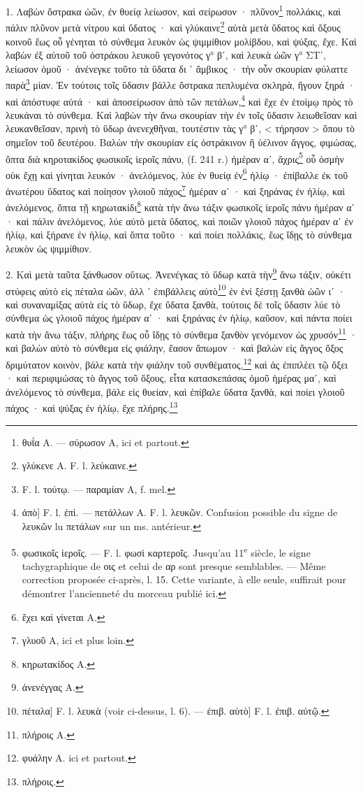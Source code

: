 \documentclass[a4paper, 11pt, oneside, polutonikogreek, french]{article}
\begin{document}
1. Λαβὼν ὄστρακα ὠῶν, ἐν θυείᾳ λείωσον, καὶ σείρωσον · πλῦνον\footnote{θυΐα A. --- σύρωσον A, ici et partout.} πολλάκις, καὶ πάλιν πλῦνον μετὰ νίτρου καὶ ὕδατος · καὶ γλύκαινε\footnote{γλύκενε A. F. l. λεύκαινε.} αὐτὰ μετὰ ὕδατος καὶ ὄξους κοινοῦ ἕως οὗ γένηται τὸ σύνθεμα λευκὸν ὡς ψιμμίθιον μολίβδου, καὶ ψύξας, ἔχε. Καὶ λαβὼν ἐξ αὐτοῦ τοῦ ὀστράκου λευκοῦ γεγονότος γ° βʹ, καὶ λευκὰ ὠῶν γ° ΣΤʹ, λείωσον ὁμοῦ · ἀνένεγκε τοῦτο τὰ ὕδατα δι ᾽ ἄμβικος · τὴν οὖν σκουρίαν φύλαττε παρὰ\footnote{F. l. τούτῳ. --- παραμίαν A, f. mel.} μίαν. Ἐν τούτοις τοῖς ὕδασιν βάλλε ὄστρακα πεπλυμένα σκληρὰ, ἤγουν ξηρά · καὶ ἀπόστυφε αὐτά · καὶ ἀποσείρωσον ἀπὸ τῶν πετάλων,\footnote{ἀπὸ] F. l. ἐπὶ. --- πετάλλων A. F. l. λευκῶν. Confusion possible du signe de λευκῶν lu πετάλων sur un ms. antérieur.} καὶ ἔχε ἐν ἑτοίμῳ πρὸς τὸ λευκάναι τὸ σύνθεμα. Καὶ λαβὼν τὴν ἄνω σκουρίαν τὴν ἐν τοῖς ὕδασιν λειωθεῖσαν καὶ λευκανθεῖσαν, πρινὴ τὸ ὕδωρ ἀνενεχθῆναι, τουτέστιν τὰς γ° βʹ, < τήρησον > ὅπου τὸ σημεῖον τοῦ δευτέρου. Βαλὼν τὴν σκουρίαν εἰς ὀστράκινον ἢ ὑέλινον ἄγγος, φιμώσας, ὄπτα διὰ κηροτακίδος φωσικοῖς ἱεροῖς πάνυ, (f. 241 r.) ἡμέραν αʹ, ἄχρις\footnote{φωσικοῖς ἱεροῖς. --- F. l. φωσὶ καρτεροῖς. Jusqu'au 11\textsuperscript{e} siècle, le signe tachygraphique de οις et celui de αρ sont presque semblables. --- Même correction proposée ci-après, l. 15. Cette variante, à elle seule, suffirait pour démontrer l'ancienneté du morceau publié ici.} οὗ ὀσμὴν οὐκ ἔχῃ καὶ γίνηται λευκόν · ἀνελόμενος, λύε ἐν θυείᾳ ἐν\footnote{ἔχει καὶ γίνεται A.} ἡλίῳ · ἐπίβαλλε ἐκ τοῦ ἀνωτέρου ὕδατος καὶ ποίησον γλοιοῦ πάχος\footnote{γλυοῦ A, ici et plus loin.} ἡμέραν αʹ · καὶ ξηράνας ἐν ἡλίῳ, καὶ ἀνελόμενος, ὄπτα τῇ κηρωτακίδι\footnote{κηρωτακίδος A.} κατὰ τὴν ἄνω τάξιν φωσικοῖς ἱεροῖς πάνυ ἡμέραν αʹ · καὶ πάλιν ἀνελόμενος, λύε αὐτὸ μετὰ ὕδατος, καὶ ποιῶν γλοιοῦ πάχος ἡμέραν αʹ ἐν ἡλίῳ, καὶ ξήρανε ἐν ἡλίῳ, καὶ ὄπτα τοῦτο · καὶ ποίει πολλάκις, ἕως ἴδῃς τὸ σύνθεμα λευκὸν ὡς ψιμμίθιον.

2. Καὶ μετὰ ταῦτα ξάνθωσον οὕτως. Ἀνενέγκας τὸ ὕδωρ κατὰ τὴν\footnote{ἀνενέγγας A.} ἄνω τάξιν, οὐκέτι στύφεις αὐτὸ εἰς πέταλα ὠῶν, ἀλλ ᾽ ἐπιβάλλεις αὐτὸ\footnote{πέταλα] F. l. λευκὰ (voir ci-dessus, l. 6). --- ἐπιβ. αὐτὸ] F. l. ἐπιβ. αὐτῷ.} ἐν ἑνὶ ξέστῃ ξανθὰ ὠῶν ιʹ · καὶ συναναμίξας αὐτὰ εἰς τὸ ὕδωρ, ἔχε ὕδατα ξανθὰ, τούτοις δὲ τοῖς ὕδασιν λύε τὸ σύνθεμα ὡς γλοιοῦ πάχος ἡμέραν αʹ · καὶ ξηράνας ἐν ἡλίῳ, καῦσον, καὶ πάντα ποίει κατὰ τὴν ἄνω τάξιν, πλήρης ἕως οὗ ἴδῃς τὸ σύνθεμα ξανθὸν γενόμενον ὡς χρυσόν\footnote{πλήροις A.} · καὶ βαλὼν αὐτὸ τὸ σύνθεμα εἰς φιάλην, ἔασον ἄπωμον · καὶ βαλὼν εἰς ἄγγος ὄξος δριμύτατον κοινὸν, βάλε κατὰ τὴν φιάλην τοῦ συνθέματος,\footnote{φυάλην A. ici et partout.} καὶ ἀς ἐπιπλέει τῷ ὄξει · καὶ περιφιμώσας τὸ ἄγγος τοῦ ὄξους, εἶτα κατασκεπάσας ὁμοῦ ἡμέρας μαʹ, καὶ ἀνελόμενος τὸ σύνθεμα, βάλε εἰς θυείαν, καὶ ἐπίβαλε ὕδατα ξανθὰ, καὶ ποίει γλοιοῦ πάχος · καὶ ψύξας ἐν ἡλίῳ, ἔχε πλήρης.\footnote{πλήροις.}
\end{document}
